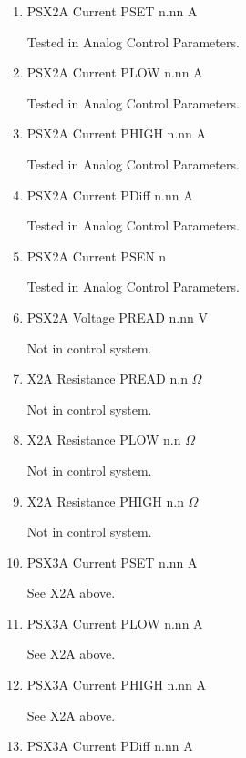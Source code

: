 \documentclass[11pt]{book}		%
\begin{document}
\begin{enumerate}
 \item PSX2A Current PSET  n.nn A

\color{red}
Tested in Analog Control Parameters.
\color{black}

 \item PSX2A Current PLOW  n.nn A

\color{red}
Tested in Analog Control Parameters.
\color{black}


 \item PSX2A Current PHIGH n.nn A

\color{red}
Tested in Analog Control Parameters.
\color{black}

 \item PSX2A Current PDiff n.nn A

\color{red}
Tested in Analog Control Parameters.
\color{black}

 \item PSX2A Current PSEN  n

\color{red}
Tested in Analog Control Parameters.
\color{black}

 \item PSX2A Voltage PREAD n.nn V

\color{red}
Not in control system.
\color{black}

 \item X2A Resistance PREAD n.n $\Omega$

\color{red}
Not in control system.
\color{black}

 \item X2A Resistance PLOW n.n $\Omega$

\color{red}
Not in control system.
\color{black}

 \item X2A Resistance PHIGH n.n $\Omega$

\color{red}
Not in control system.
\color{black}

 \item PSX3A Current PSET  n.nn A

\color{red}
See X2A above.
\color{black}


 \item PSX3A Current PLOW  n.nn A

\color{red}
See X2A above.
\color{black}

 \item PSX3A Current PHIGH n.nn A

\color{red}
See X2A above.
\color{black}

 \item PSX3A Current PDiff n.nn A


\end{enumerate}
\end{document}
